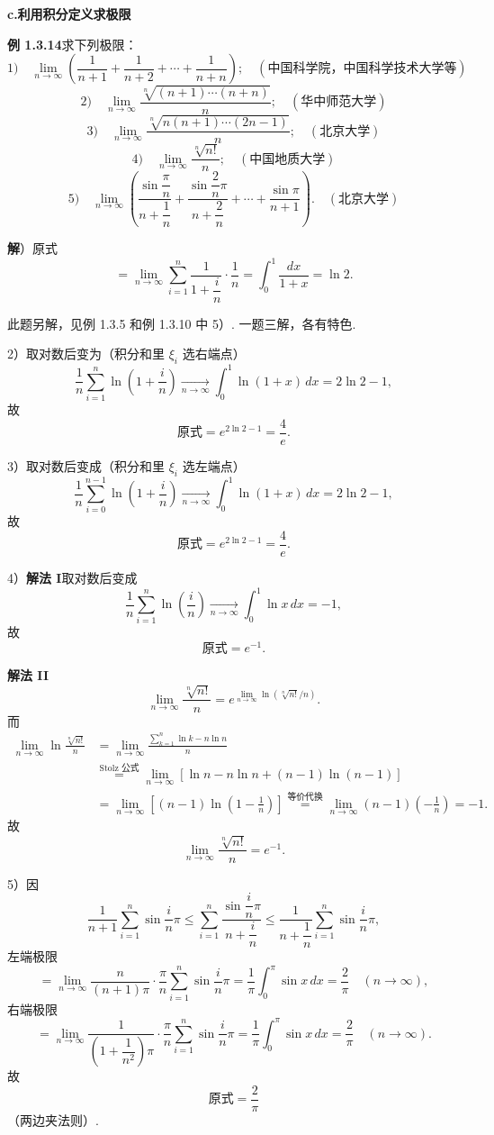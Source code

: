 \documentclass[UTF8, 12pt, fontset=fandol, oneside]{ctexart}
\begin{document}
\noindent\textbf{c.\quad 利用积分定义求极限}

\noindent\textbf{例 1.3.14}\quad 求下列极限：
\[
1)\quad
\lim_{n\to\infty}
\left(\frac1{n+1}+\frac1{n+2}+\cdots+\frac1{n+n}\right);
\quad(\text{中国科学院，中国科学技术大学等})
\]
\[
2)\quad
\lim_{n\to\infty}\frac{\sqrt[n]{(n+1)\cdots(n+n)}}n;
\quad(\text{华中师范大学})
\]
\[
3)\quad
\lim_{n\to\infty}\frac{\sqrt[n]{n(n+1)\cdots(2n-1)}}n;
\quad(\text{北京大学})
\]
\[
4)\quad
\lim_{n\to\infty}\frac{\sqrt[n]{n!}}n;
\quad(\text{中国地质大学})
\]
\[
5)\quad
\lim_{n\to\infty}
\left(
\frac{\sin\dfrac{\pi}{n}}{n+\dfrac1n}
+\frac{\sin\dfrac2n\pi}{n+\dfrac2n}
+\cdots+
\frac{\sin\pi}{n+1}
\right).
\quad(\text{北京大学})
\]

\noindent\textbf{解}）原式
\[
  =\lim_{n\to\infty}\sum_{i=1}^n
  \frac1{1+\dfrac in}\cdot\frac1n
  =\int_0^1\frac{dx}{1+x}=\ln2.
\]

此题另解，见例 1.3.5 和例 1.3.10 中 5）. 一题三解，各有特色.

2）取对数后变为（积分和里 $\xi_i$ 选右端点）
\[
  \frac1n\sum_{i=1}^n\ln\left(1+\frac in\right)
  \xrightarrow[n\to\infty]{}
  \int_0^1\ln(1+x)\,dx=2\ln2-1,
\]
故
\[
  \text{原式}=e^{2\ln2-1}=\frac4e.
\]

3）取对数后变成（积分和里 $\xi_i$ 选左端点）
\[
  \frac1n\sum_{i=0}^{n-1}\ln\left(1+\frac in\right)
  \xrightarrow[n\to\infty]{}
  \int_0^1\ln(1+x)\,dx=2\ln2-1,
\]
故
\[
  \text{原式}=e^{2\ln2-1}=\frac4e.
\]

4）\textbf{解法 I}\quad 取对数后变成
\[
  \frac1n\sum_{i=1}^n\ln\left(\frac in\right)
  \xrightarrow[n\to\infty]{}
  \int_0^1\ln x\,dx=-1,
\]
故
\[
  \text{原式}=e^{-1}.
\]

\noindent\textbf{解法 II}\quad
\[
  \lim_{n\to\infty}\frac{\sqrt[n]{n!}}n
  =e^{\lim\limits_{n\to\infty}\ln(\sqrt[n]{n!}/n)}.
\]
而
\[
\begin{aligned}
\lim_{n\to\infty}\ln\frac{\sqrt[n]{n!}}n
&=\lim_{n\to\infty}\frac{\sum_{k=1}^n\ln k-n\ln n}{n}\\
&\stackrel{\text{Stolz 公式}}{=}
\lim_{n\to\infty}
\left[\ln n-n\ln n+(n-1)\ln(n-1)\right]\\
&=\lim_{n\to\infty}
\left[(n-1)\ln\left(1-\frac1n\right)\right]
\stackrel{\text{等价代换}}{=}
\lim_{n\to\infty}(n-1)\left(-\frac1n\right)=-1.
\end{aligned}
\]
故
\[
  \lim_{n\to\infty}\frac{\sqrt[n]{n!}}n=e^{-1}.
\]

5）因
\[
  \frac1{n+1}\sum_{i=1}^n\sin\frac in\pi
  \le
  \sum_{i=1}^n\frac{\sin\dfrac in\pi}{n+\dfrac in}
  \le
  \frac1{n+\dfrac1n}\sum_{i=1}^n\sin\frac in\pi,
\]
左端极限
\[
  =\lim_{n\to\infty}\frac{n}{(n+1)\pi}\cdot
  \frac\pi n\sum_{i=1}^n\sin\frac in\pi
  =\frac1\pi\int_0^\pi\sin x\,dx
  =\frac2\pi\quad(n\to\infty),
\]
右端极限
\[
  =\lim_{n\to\infty}
  \frac1{\left(1+\dfrac1{n^2}\right)\pi}\cdot
  \frac\pi n\sum_{i=1}^n\sin\frac in\pi
  =\frac1\pi\int_0^\pi\sin x\,dx
  =\frac2\pi\quad(n\to\infty).
\]
故
\[
  \text{原式}=\frac2\pi
\]
（两边夹法则）.
\end{document}
